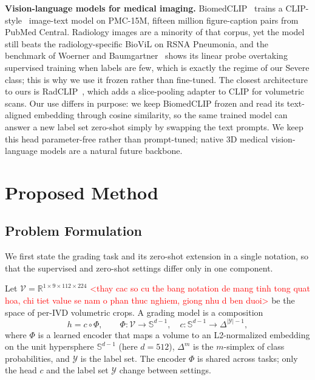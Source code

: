 \documentclass[runningheads]{llncs}
\begin{document}
\textbf{Vision-language models for medical imaging.}
BiomedCLIP~\cite{zhang2023biomedclip} trains a CLIP-style~\cite{radford2021clip} image-text model on PMC-15M, fifteen million figure-caption pairs from PubMed Central. Radiology images are a minority of that corpus, yet the model still beats the radiology-specific BioViL on RSNA Pneumonia, and the benchmark of Woerner and Baumgartner~\cite{datascarcity2024} shows its linear probe overtaking supervised training when labels are few, which is exactly the regime of our Severe class; this is why we use it frozen rather than fine-tuned. The closest architecture to ours is RadCLIP~\cite{lu2024radclip}, which adds a slice-pooling adapter to CLIP for volumetric scans. Our use differs in purpose: we keep BiomedCLIP frozen and read its text-aligned embedding through cosine similarity, so the same trained model can answer a new label set zero-shot simply by swapping the text prompts. We keep this head parameter-free rather than prompt-tuned; native 3D medical vision-language models are a natural future backbone.

\section{Proposed Method}\label{sec3}

\subsection{Problem Formulation}\label{sec:formulation}

We first state the grading task and its zero-shot extension in a single notation, so that the supervised and zero-shot settings differ only in one component.

Let $\mathcal{V} = \mathbb{R}^{1 \times 9 \times 112 \times 224}$ \textcolor{red}{<thay cac so cu the bang notation de mang tinh tong quat hoa, chi tiet value se nam o phan thuc nghiem, giong nhu d ben duoi>} be the space of per-IVD volumetric crops. A grading model is a composition
\begin{equation}
h = c \circ \Phi, \qquad \Phi : \mathcal{V} \to \mathbb{S}^{d-1}, \quad c : \mathbb{S}^{d-1} \to \Delta^{|\mathcal{Y}|-1},
\label{eq:composition}
\end{equation}
where $\Phi$ is a learned encoder that maps a volume to an L2-normalized embedding on the unit hypersphere $\mathbb{S}^{d-1}$ (here $d = 512$), $\Delta^{m}$ is the $m$-simplex of class probabilities, and $\mathcal{Y}$ is the label set. The encoder $\Phi$ is shared across tasks; only the head $c$ and the label set $\mathcal{Y}$ change between settings.
\end{document}
